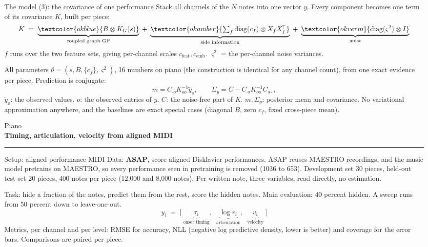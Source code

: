 \documentclass[aspectratio=169,11pt]{beamer}
\newcommand{\diag}{\operatorname{diag}}
\newcommand{\divider}[2]{\begin{frame}\centering\vfill
  {\small\textcolor{muted}{#1}}\\[2mm]
  {\LARGE\textbf{#2}}\\[4mm]
  {\color{okblue}\rule{62mm}{1.2pt}}\vfill\end{frame}}
\begin{document}
\begin{frame}{The model (3): the covariance of one performance}
  Stack all channels of the $N$ notes into one vector $y$.
  Every component becomes one term of its covariance $K$, built per piece:
  \begin{equation*}
    K \;=\;
    \underbrace{\textcolor{okblue}{B \otimes K_G(s)}}_{\text{coupled graph GP}}
    \;+\; \underbrace{\textcolor{okamber}{\textstyle\sum_f \diag(c_f)\otimes X_f X_f^{\!\top}}}_{\text{side information}}
    \;+\; \underbrace{\textcolor{okverm}{\diag(\varsigma^2)\otimes I}}_{\text{noise}}
  \end{equation*}
  {\small $f$ runs over the two feature sets, giving per-channel scales
  $c_{\mathrm{feat}}, c_{\mathrm{emb}}$. $\varsigma^2$ = the per-channel
  noise variances.}
  \vspace{1mm}

  All parameters $\theta = (s, B, \{c_f\}, \varsigma^2)$, 16 numbers on
  piano (the construction is identical for any channel count), from one
  exact evidence per piece. Prediction is conjugate:
  \begin{equation*}
    m = C_{\cdot o} K_{oo}^{-1} \tilde y_o, \qquad
    \Sigma_y = C - C_{\cdot o} K_{oo}^{-1} C_{o\cdot},
  \end{equation*}
  {\small $\tilde y_o$: the observed values. $o$: the observed entries of
  $y$. $C$: the noise-free part of $K$. $m, \Sigma_y$: posterior mean and
  covariance. No variational approximation anywhere, and the baselines are
  exact special cases (diagonal $B$, zero $c_f$, fixed cross-piece mean).}
\end{frame}

\divider{Piano}{Timing, articulation, velocity from aligned MIDI}

\begin{frame}{Setup: aligned performance MIDI}
  Data: \textbf{ASAP}, score-aligned Disklavier performances. ASAP
  reuses MAESTRO recordings, and the music model pretrains on MAESTRO,
  so every performance seen in pretraining is removed (1036 to 653).
  Development set 30 pieces, held-out test set 20 pieces, 400 notes
  per piece (12{,}000 and 8{,}000 notes). Per written note, three
  variables, read directly, no estimation.
  \vspace{1mm}

  Task: hide a fraction of the notes, predict them from the rest, score
  the hidden notes. Main evaluation: 40 percent hidden. A sweep runs
  from 50 percent down to leave-one-out.
  \begin{equation*}
    y_i \;=\; \bigl[\;\underbrace{\tau_i}_{\text{onset timing}},\;\;
      \underbrace{\log r_i}_{\text{articulation}},\;\;
      \underbrace{v_i}_{\text{velocity}}\;\bigr]
  \end{equation*}
  \vfill
  Metrics, per channel and per level: RMSE for accuracy, NLL (negative
  log predictive density, lower is better) and coverage for the error
  bars. Comparisons are paired per piece.
\end{frame}
\end{document}
